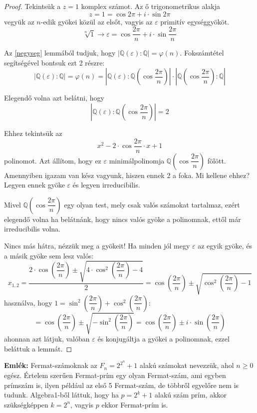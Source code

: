 \documentclass[12pt]{book}
\theoremstyle{plain} %
\theoremstyle{definition} %
\theoremstyle{remark}
\numberwithin{equation}{section}  %
\begin{document}
	\begin{proof}
		Tekintsük a $z=1$ komplex számot. Az ő trigonometrikus alakja
		\[ z = 1 =  \cos 2\pi  + i\cdot \sin 2\pi \]
		vegyük az $n$-edik gyökei közül az elsőt, vagyis az $\varepsilon$ primitív egységgyököt.
		\[  \sqrt[n]{1} \to \varepsilon = \cos \dfrac{2\pi}{n}+ i\cdot \sin \dfrac{2\pi}{n}  \]
		
		Az \ref{negyseg} lemmából tudjuk, hogy $|\mathbb{Q}(\varepsilon):\mathbb{Q}| = \varphi(n)$. Fokszámtétel segítségével bontsuk ezt 2 részre:
		\[ |\mathbb{Q}(\varepsilon):\mathbb{Q}| = \varphi(n) = \left |\mathbb{Q}(\varepsilon):\mathbb{Q}\left(\cos \dfrac{2\pi}{n}\right)\right|\cdot \left|\mathbb{Q}\left(\cos \dfrac{2\pi}{n}\right):\mathbb{Q}\right|  \]
		
		Elegendő volna azt belátni, hogy
		\[ \left |\mathbb{Q}(\varepsilon):\mathbb{Q}\left(\cos \dfrac{2\pi}{n}\right)\right| = 2  \]
		
		Ehhez tekintsük az
		\[ x^2 - 2\cdot  \cos \dfrac{2\pi }{n} \cdot  x + 1  \]
		polinomot. Azt állítom, hogy ez $\varepsilon$ minimálpolinomja $\mathbb{Q}\left(\cos \dfrac{2\pi}{n}\right)$ fölött. Amennyiben igazam van kész vagyunk, hiszen ennek 2 a foka. Mi kellene ehhez? Legyen ennek gyöke $\varepsilon$ és legyen irreducibilis.
		
		Mivel $\mathbb{Q}\left(\cos \dfrac{2\pi}{n}\right)$ egy olyan test, mely csak valós számokat tartalmaz, ezért elegendő volna ha belátnánk, hogy nincs valós gyöke a polinomnak, ettől már irreducibilis volna.
		
		Nincs más hátra, nézzük meg a gyökeit! Ha minden jól megy $\varepsilon$ az egyik gyöke, és a másik gyöke sem lesz valós:
		\[ x_{1,2}=\dfrac{2\cdot \cos\left(\dfrac{2\pi}{n}\right) \pm \sqrt{4\cdot \cos^2\left(\dfrac{2\pi}{n}\right) - 4 }}{2} = \cos\left(\dfrac{2\pi}{n}\right) \pm \sqrt{\cos^2\left(\dfrac{2\pi}{n}\right) -1 }  \]
		használva, hogy $1=\sin^2\left(\dfrac{2\pi}{n}\right)+\cos^2\left(\dfrac{2\pi}{n}\right)$:
		\[ = \cos\left(\dfrac{2\pi}{n}\right) \pm \sqrt{-\sin^2\left(\dfrac{2\pi}{n}\right)} = \cos\left(\dfrac{2\pi}{n}\right) \pm i\cdot \sin\left(\dfrac{2\pi}{n}\right)   \]
		ahonnan azt látjuk, valóban $\varepsilon$ és konjugáltja a gyökei a polinomnak, ezzel beláttuk a lemmát.
	\end{proof}

	\textbf{Emlék:} Fermat-számoknak az $F_n = 2^{2^n}+1$ alakú számokat nevezzük, ahol $n\geq 0$ egész. Értelem szerűen Fermat-prím egy olyan Fermat-szám, ami egyben prímszám is, ilyen például az első 5 Fermat-szám, de többről egyelőre nem is tudunk. Algebra1-ből láttuk, hogy ha $p=2^k+1$ alakú szám prím, akkor szükségképpen $k=2^n$, vagyis $p$ ekkor Fermat-prím is.
\end{document}
